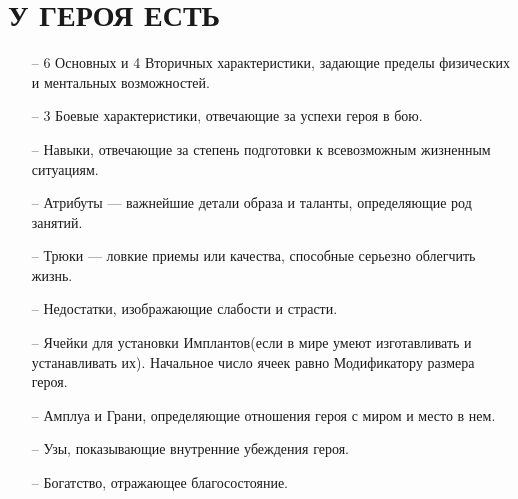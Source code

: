 \section{У ГЕРОЯ ЕСТЬ}
\begin{itemize}
\item[--] 6 Основных и 4 Вторичных характеристики, задающие пределы физических и ментальных возможностей.
\item[--] 3 Боевые характеристики, отвечающие за успехи героя в бою.
\item[--] Навыки, отвечающие за степень подготовки к всевозможным жизненным ситуациям.
\item[--] Атрибуты — важнейшие детали образа и таланты, определяющие род занятий.
\item[--] Трюки — ловкие приемы или качества, способные серьезно облегчить жизнь.
\item[--] Недостатки, изображающие слабости и страсти.
\item[--] Ячейки для установки Имплантов(если в мире умеют изготавливать и устанавливать их). Начальное число ячеек равно Модификатору размера героя.
\item[--] Амплуа и Грани, определяющие отношения героя с миром и место в нем.
\item[--] Узы, показывающие внутренние убеждения героя.
\item[--] Богатство, отражающее благосостояние.
\end{itemize}
